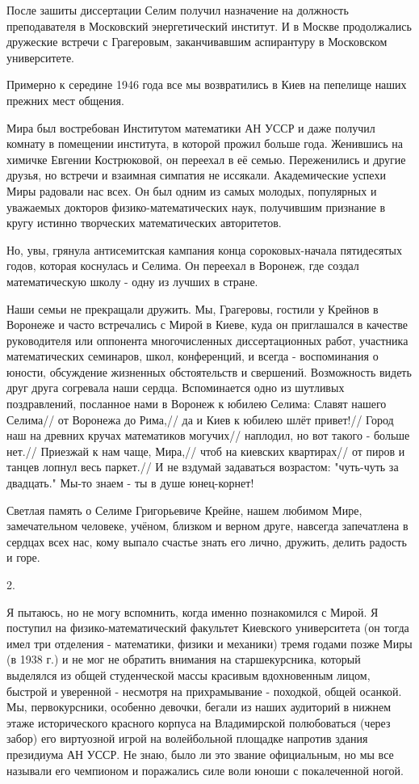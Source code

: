 После зашиты диссертации Селим получил назначение на должность преподавателя в Московский энергетический институт. И в Москве продолжались дружеские встречи с Грагеровым, заканчивавшим аспирантуру в Московском университете.

Примерно к середине 1946 года все мы возвратились в Киев на пепелище наших прежних мест общения.

Мира был востребован Институтом математики АН УССР и даже получил комнату в помещении института, в которой прожил больше года. Женившись на химичке Евгении Кострюковой, он переехал в её семью. Переженились и другие друзья, но встречи и взаимная симпатия не иссякали. Академические успехи Миры радовали нас всех. Он был одним из самых молодых, популярных и уважаемых докторов физико-математических наук, получившим признание в кругу истинно творческих математических авторитетов.

Но, увы, грянула антисемитская кампания конца сороковых-начала пятидесятых годов, которая коснулась и Селима. Он переехал в Воронеж, где создал математическую школу - одну из лучших в стране.

Наши семьи не прекращали дружить. Мы, Грагеровы, гостили у Крейнов в Воронеже и часто встречались с Мирой в Киеве, куда он приглашался в качестве руководителя или оппонента многочисленных диссертационных работ, участника математических семинаров, школ, конференций, и всегда - воспоминания о юности, обсуждение жизненных обстоятельств и свершений. Возможность видеть друг друга согревала наши сердца. Вспоминается одно из шутливых поздравлений, посланное нами в Воронеж к юбилею Селима:
Славят нашего Селима//
от Воронежа до Рима,//
да и Киев к юбилею шлёт привет!//
Город наш на древних кручах математиков могучих//
наплодил, но вот такого - больше нет.//
Приезжай к нам чаще, Мира,//
чтоб на киевских квартирах//
от пиров и танцев лопнул весь паркет.//
И не вздумай задаваться возрастом: "чуть-чуть за двадцать." Мы-то знаем - ты в душе юнец-корнет!

Светлая память о Селиме Григорьевиче Крейне, нашем любимом Мире, замечательном человеке, учёном, близком и верном друге, навсегда запечатлена в сердцах всех нас, кому выпало счастье знать его лично, дружить, делить радость и горе.

2.

Я пытаюсь, но не могу вспомнить, когда именно познакомился с Мирой. Я поступил на физико-математический факультет Киевского университета (он тогда имел три отделения - математики, физики и механики) тремя годами позже Миры (в 1938 г.) и не мог не обратить внимания на старшекурсника, который выделялся из общей студенческой массы красивым вдохновенным лицом, быстрой и уверенной - несмотря на прихрамывание - походкой, общей осанкой. Мы, первокурсники, особенно девочки, бегали из наших аудиторий в нижнем этаже исторического красного корпуса на Владимирской полюбоваться (через забор) его виртуозной игрой на волейбольной площадке напротив здания президиума АН УССР. Не знаю, было ли это звание официальным, но мы все называли его чемпионом и поражались силе воли юноши с покалеченной ногой.

